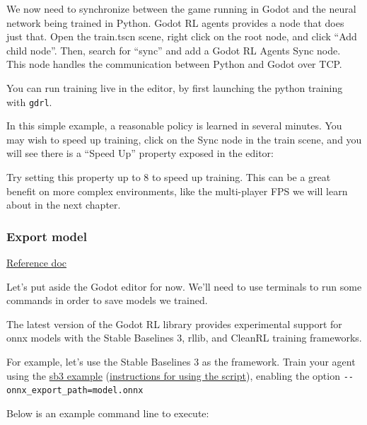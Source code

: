 \documentclass[11pt,a4paper]{article}
\begin{document}
We now need to synchronize between the game running in Godot and the neural network being trained in Python. Godot RL agents provides a node that does just that. Open the train.tscn scene, right click on the root node, and click ``Add child node''. Then, search for ``sync'' and add a Godot RL Agents Sync node. This node handles the communication between Python and Godot over TCP.

You can run training live in the editor, by first launching the python training with \texttt{gdrl}.

In this simple example, a reasonable policy is learned in several minutes. You may wish to speed up training, click on the Sync node in the train scene, and you will see there is a ``Speed Up'' property exposed in the editor:


Try setting this property up to 8 to speed up training. This can be a great benefit on more complex environments, like the multi-player FPS we will learn about in the next chapter.

\subsubsection{Export model}\label{export-model}

\href{https://github.com/edbeeching/godot_rl_agents/tree/main?tab=readme-ov-file\#exporting-and-loading-your-trained-agent-in-onnx-format}{Reference doc}

Let's put aside the Godot editor for now. We'll need to use terminals to run some commands in order to save models we trained.

The latest version of the Godot RL library provides experimental support for onnx models with the Stable Baselines 3, rllib, and CleanRL training frameworks.

For example, let's use the Stable Baselines 3 as the framework. Train your agent using the \href{https://github.com/edbeeching/godot_rl_agents/blob/main/examples/stable_baselines3_example.py}{sb3 example} (\href{https://github.com/edbeeching/godot_rl_agents/blob/main/docs/ADV_STABLE_BASELINES_3.md\#train-a-model-from-scratch}{instructions for using the script}), enabling the option \texttt{-\/-onnx\_export\_path=model.onnx}

Below is an example command line to execute:
\end{document}
